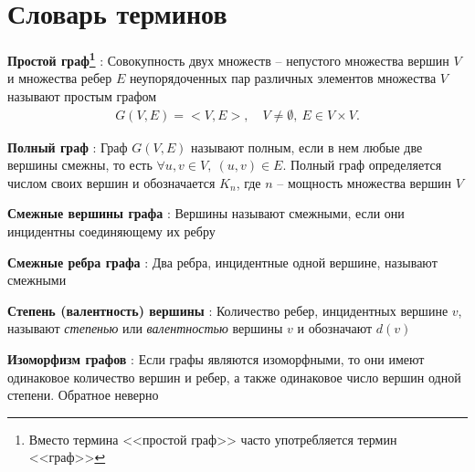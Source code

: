 \chapter*{Словарь терминов}             %

\textbf{Простой граф\footnote{Вместо термина <<простой граф>> часто употребляется термин <<граф>>}} : Совокупность двух множеств -- непустого множества вершин $ V $ и множества ребер $ E $ неупорядоченных пар различных элементов множества $ V $ называют простым графом
\begin{align*}
	G(V, E) = <V, E>, \quad V \neq \emptyset,\ E \in V \times V.
\end{align*}

\textbf{Полный граф} : Граф $ G(V, E) $ называют полным, если в нем любые две вершины смежны, то есть $ \forall u, v \in V, \ (u, v) \in E $. Полный граф определяется числом своих вершин и обозначается $ K_n $, где $ n $ -- мощность множества вершин $ V $

\textbf{Смежные вершины графа} : Вершины называют смежными, если они инцидентны соединяющему их ребру

\textbf{Смежные ребра графа} : Два ребра, инцидентные одной вершине, называют смежными

\textbf{Степень (валентность) вершины} : Количество ребер, инцидентных вершине $ v $, называют \emph{степенью} или \emph{валентностью} вершины $ v $ и обозначают $ d(v) $

\textbf{Изоморфизм графов} : Если графы являются изоморфными, то они имеют одинаковое количество вершин и ребер, а также одинаковое число вершин одной степени. Обратное неверно
